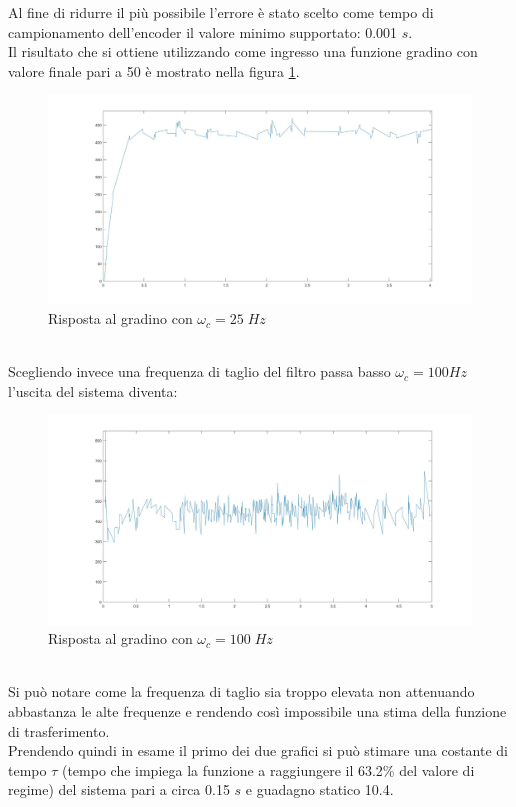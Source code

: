 Al fine di ridurre il più possibile l'errore è stato scelto come tempo di campionamento dell'encoder il valore minimo supportato: 0.001 $s$.\\
Il risultato che si ottiene utilizzando come ingresso una funzione gradino con valore finale pari a 50 è mostrato nella figura \ref{motore50StepCamp1000}.
\begin{figure}[ht]
	\centering
	\includegraphics[width=\textwidth]{motore50StepCamp1000.jpg}
	\caption{Risposta al gradino con $\omega_c=25\;Hz$}
	\label{motore50StepCamp1000}
\end{figure}
\\Scegliendo invece una frequenza di taglio del filtro passa basso $\omega_c = 100Hz$ l'uscita del sistema diventa:
\begin{figure}[ht]
	\centering
	\includegraphics[width=\textwidth]{motore50StepCamp1000Polo100.jpg}
	\caption{Risposta al gradino con $\omega_c=100\;Hz$ }
	\label{motore50StepCamp1000Polo100}
\end{figure}
\\Si può notare come la frequenza di taglio sia troppo elevata non attenuando abbastanza le alte frequenze e rendendo così impossibile una stima della funzione di trasferimento.\\
Prendendo quindi in esame il primo dei due grafici si può stimare una costante di tempo $\tau$ (tempo che impiega la funzione a raggiungere il 63.2\% del valore di regime) del sistema pari a circa 0.15 $s$ e guadagno statico 10.4.\\\\
